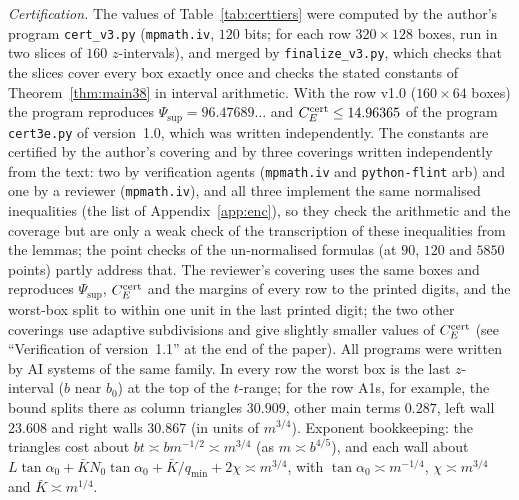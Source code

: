 \documentclass[11pt]{amsart}
\newcommand{\taz}{\tan\alpha_0}
\newcommand{\Kb}{\bar K}
\theoremstyle{definition}
\theoremstyle{remark}
\numberwithin{equation}{section}
\begin{document}
\emph{Certification.} The values of Table~\ref{tab:certtiers} were computed by the author's program
\texttt{cert\_v3.py} (\texttt{mpmath.iv}, $120$ bits; for each row $320\times128$ boxes, run in two slices of $160$
$z$-intervals), and merged by \texttt{finalize\_v3.py}, which checks that the slices cover every box exactly once and
checks the stated constants of Theorem~\ref{thm:main38} in interval arithmetic. With the row v1.0 ($160\times64$ boxes)
the program reproduces $\Psi_{\sup}=96.47689\ldots$ and $C_E^{\rm cert}\le14.96365$ of the program \texttt{cert3e.py} of
version~1.0, which was written independently. The constants are certified by the author's covering and by three
coverings written independently from the text: two by verification agents (\texttt{mpmath.iv} and \texttt{python-flint}
arb) and one by a reviewer (\texttt{mpmath.iv}), and all three implement the same normalised inequalities (the list of Appendix~\ref{app:enc}), so they check the arithmetic and the coverage but are only a weak check of the transcription of these inequalities from the lemmas; the point checks of the un-normalised formulas (at \(90\), \(120\) and \(5850\) points) partly address that. The reviewer's covering uses the same boxes and reproduces $\Psi_{\sup}$,
$C_E^{\rm cert}$ and the margins of every row to the printed digits, and the worst-box split to within one unit in the
last printed digit; the two other coverings use
adaptive subdivisions and give slightly smaller values of $C_E^{\rm cert}$ (see ``Verification of version~1.1'' at the
end of the paper). All programs were written by AI systems of the same family. In every row the worst box is the last
$z$-interval ($b$ near $b_0$) at the top of the $t$-range; for the row A1s, for example, the bound splits there as column
triangles $30.909$, other main terms $0.287$, left wall $23.608$ and right walls
$30.867$ (in units of $m^{3/4}$). Exponent bookkeeping: the triangles cost about
$bt\asymp bm^{-1/2}\asymp m^{3/4}$ (as $m\asymp b^{4/5}$), and each wall about
$L\taz+\Kb N_0\taz+\Kb/q_{\min}+2\chi\asymp m^{3/4}$, with $\taz\asymp m^{-1/4}$, $\chi\asymp m^{3/4}$ and
$\Kb\asymp m^{1/4}$.
\end{document}

